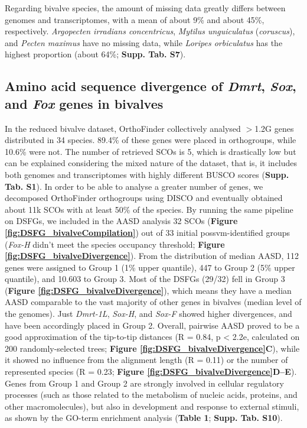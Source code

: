 \documentclass[../main.tex]{subfiles}
\begin{document}
Regarding bivalve species, the amount of missing data greatly differs between genomes and transcriptomes, with a mean of about 9\% and about 45\%, respectively. \textit{Argopecten irradians concentricus}, \textit{Mytilus unguiculatus} (\textit{coruscus}), and \textit{Pecten maximus} have no missing data, while \textit{Loripes orbiculatus} has the highest proportion (about 64\%; \textbf{Supp. Tab. S7}).

\subsection{Amino acid sequence divergence of \textit{Dmrt}, \textit{Sox}, and \textit{Fox} genes in bivalves}
In the reduced bivalve dataset, OrthoFinder collectively analysed $>$1.2G genes distributed in 34 species. 89.4\% of these genes were placed in orthogroups, while 10.6\% were not. The number of retrieved SCOs is 5, which is drastically low but can be explained considering the mixed nature of the dataset, that is, it includes both genomes and transcriptomes with highly different BUSCO scores (\textbf{Supp. Tab. S1}). In order to be able to analyse a greater number of genes, we decomposed OrthoFinder orthogroups using DISCO and eventually obtained about 11k SCOs with at least 50\% of the species. By running the same pipeline on DSFGs, we included in the AASD analysis 32 SCOs (\textbf{Figure \ref{fig:DSFG_bivalveCompilation}}) out of 33 initial possvm-identified groups (\textit{Fox-H} didn’t meet the species occupancy threshold; \textbf{Figure \ref{fig:DSFG_bivalveDivergence}}).
From the distribution of median AASD, 112 genes were assigned to Group 1 (1\% upper quantile), 447 to Group 2 (5\% upper quantile), and 10.603 to Group 3. Most of the DSFGs (29/32) fell in Group 3 (\textbf{Figure \ref{fig:DSFG_bivalveDivergence}}), which means they have a median AASD comparable to the vast majority of other genes in bivalves (median level of the genomes). Just \textit{Dmrt-1L}, \textit{Sox-H}, and \textit{Sox-F} showed higher divergences, and have been accordingly placed in Group 2. Overall, pairwise AASD proved to be a good approximation of the tip-to-tip distances (R = 0.84, p < 2.2e, calculated on 200 randomly-selected trees; \textbf{Figure \ref{fig:DSFG_bivalveDivergence}C}), while it showed no influence from the alignment length (R = 0.11) or the number of represented species (R =   0.23; \textbf{Figure \ref{fig:DSFG_bivalveDivergence}D--E}). Genes from Group 1 and Group 2 are strongly involved in cellular regulatory processes (such as those related to the metabolism of nucleic acids, proteins, and other macromolecules), but also in development and response to external stimuli, as shown by the GO-term enrichment analysis (\textbf{Table 1}; \textbf{Supp. Tab. S10}).
\end{document}
